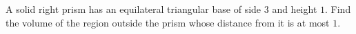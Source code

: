 A solid right prism has an equilateral triangular base of side $3$ and height $1$. Find the volume of the region outside the prism whose distance from it is at most $1$.
